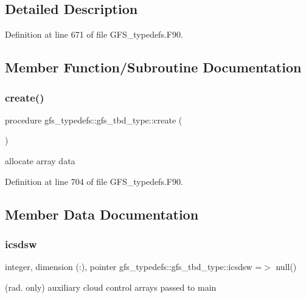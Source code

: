 \subsection{Detailed Description}


Definition at line 671 of file G\+F\+S\+\_\+typedefs.\+F90.



\subsection{Member Function/\+Subroutine Documentation}
\mbox{\label{structgfs__typedefs_1_1gfs__tbd__type_a396b6323c752b39a7984a788253cd9b4}} 
\subsubsection{create()}
{\footnotesize\ttfamily procedure gfs\+\_\+typedefs\+::gfs\+\_\+tbd\+\_\+type\+::create (\begin{DoxyParamCaption}{ }\end{DoxyParamCaption})}



allocate array data 



Definition at line 704 of file G\+F\+S\+\_\+typedefs.\+F90.



\subsection{Member Data Documentation}
\mbox{\label{structgfs__typedefs_1_1gfs__tbd__type_a105649eb93aa06360ca49dd00572a479}} 
\subsubsection{icsdsw}
{\footnotesize\ttfamily integer, dimension   (\+:), pointer gfs\+\_\+typedefs\+::gfs\+\_\+tbd\+\_\+type\+::icsdsw =$>$ null()}



(rad. only) auxiliary cloud control arrays passed to main 



